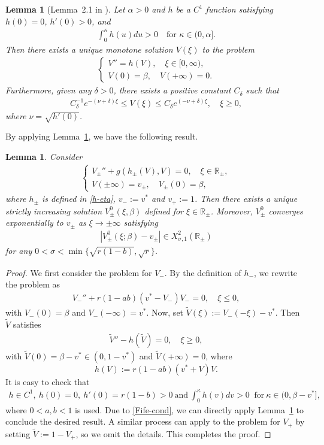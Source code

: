 \documentclass[11pt,a4paper]{article}
\newtheorem{lemma}[theorem]{\textbf{Lemma}}
\numberwithin{equation}{section}
\numberwithin{figure}{section}
\newcommand\bea{\begin{eqnarray}}
\newcommand\eea{\end{eqnarray}}
\newcommand\beaa{\begin{eqnarray*}}
\newcommand\eeaa{\end{eqnarray*}}
\begin{document}
\begin{lemma}[Lemma~2.1 in \cite{Fife1973}]\label{lem:Fife1973-0}
Let $\alpha>0$ and $h$ be a $C^1$ function satisfying $h(0)=0$, $h'(0)>0$, and
\beaa
\int_0^{\kappa}h(u)du>0\quad \mbox{for $\kappa\in(0,\alpha]$.}
\eeaa
Then there exists a unique monotone solution $V(\xi)$ to the problem
\beaa
\begin{cases}
V''=h(V),\quad  \xi\in[0,\infty),\\
V(0)=\beta,\quad V(+\infty)=0.
\end{cases}
\eeaa
Furthermore, given any $\delta>0$, there exists a positive constant $C_{\delta}$ such that
\beaa
C_{\delta}^{-1}e^{-(\nu+\delta)\xi}\leq V(\xi)\leq C_{\delta}e^{(-\nu+\delta)\xi},\quad \xi\geq 0,
\eeaa
where $\nu=\sqrt{h'(0)}$.
\end{lemma}

By applying Lemma~\ref{lem:Fife1973-0}, we have the following result.



\begin{lemma}\label{lem:Fife1973}
Consider
\beaa
\begin{cases}
V_{\pm}''+g(h_{\pm}(V),V)=0,\quad \xi\in\mathbb{R}_{\pm},\\
 V(\pm\infty)=v_{\pm},\quad V_{\pm}(0)=\beta,
\end{cases}
\eeaa
where $h_{\pm}$ is defined in \eqref{h-eta},
$v_-:=v^*$ and
$v_+:=1$. Then there exists a unique strictly increasing solution $V^0_{\pm}(\xi,\beta)$ defined for $\xi\in\mathbb{R}_{\pm}$.
Moreover, $V^0_{\pm}$ converges exponentially to $v_{\pm}$ as $\xi\to\pm\infty$ satisfying
\bea\label{exp-decay-V0}
|V^0_{\pm}(\xi;\beta)-v_{\pm}|\in X^2_{\sigma,1}(\mathbb{R}_{\pm})
\eea
for any  $0<\sigma<\min\{\sqrt{r(1-b)},\sqrt{r}\}$.
\end{lemma}
\begin{proof}
We first consider the problem for $V_-$. By the definition of $h_-$, we rewrite the problem as
\beaa
V_{-}''+r(1-ab)(v^*-V_-)V_-=0,\quad \xi\leq 0,
\eeaa
with $V_-(0)=\beta$ and $V_-(-\infty)=v^*$. Now, set $\widetilde{V}(\xi):=V_-(-\xi)-v^*$. Then $\widetilde{V}$ satisfies
\beaa
\widetilde{V}''-h(\widetilde{V})=0,\quad \xi\geq 0,
\eeaa
with $\widetilde{V}(0)=\beta-v^*\in(0,1-v^*)$ and $\widetilde{V}(+\infty)=0$,
where 
$$h(V):=r(1-ab)(v^*+V)V.$$
It is easy to check that
\bea\label{Fife-cond}
h\in C^1,\ h(0)=0, \ h'(0)=r(1-b)>0\ \mbox{and}\ \int_0^{\kappa}h(v)dv>0\ \mbox{ for} \ \kappa\in(0,\beta-v^*],
\eea
where $0<a,b<1$ is used.
Due to \eqref{Fife-cond}, we can directly apply %
Lemma~\ref{lem:Fife1973-0}
to conclude the desired result.
A similar process can apply to the problem for $V_+$ by setting $\widetilde{V}:=1-V_+$, so we omit the details. This completes the proof.
\end{proof}
\end{document}
